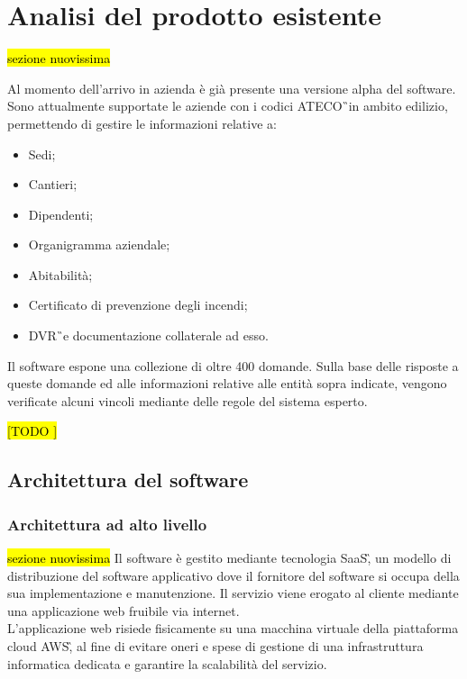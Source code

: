 
\section{Analisi del prodotto esistente}
\hl{sezione nuovissima}

Al momento dell'arrivo in azienda è già presente una versione alpha del software. \\
Sono attualmente supportate le aziende con i codici \gls{ATECO}\G\ in ambito edilizio, permettendo di gestire le informazioni relative a:
\begin{itemize}
	\item Sedi;
	\item Cantieri;
	\item Dipendenti;
	\item Organigramma aziendale;
	\item Abitabilità;
	\item Certificato di prevenzione degli incendi;
	\item \gls{DVR}\G\ e documentazione collaterale ad esso.
\end{itemize}
Il software espone una collezione di oltre 400 domande. Sulla base delle risposte a queste domande ed alle informazioni relative alle entità sopra indicate, vengono verificate alcuni vincoli mediante delle regole del sistema esperto.


\hl{[TODO ]}

\subsection{Architettura del software}
\subsubsection{Architettura ad alto livello}
\hl{sezione nuovissima}
Il software è gestito mediante tecnologia \gls{SaaS}\G, un modello di distribuzione del software applicativo dove il fornitore del software si occupa della sua implementazione e manutenzione. Il servizio viene erogato al cliente mediante una applicazione web fruibile via internet. \\ 
L'applicazione web risiede fisicamente su una macchina virtuale della piattaforma cloud \gls{AWS}\G, al fine di evitare oneri e spese di gestione di una infrastruttura informatica dedicata e garantire la scalabilità del servizio.\\

